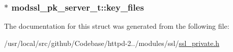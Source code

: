 \subsubsection[{\texorpdfstring{key\+\_\+files}{key_files}}]{$\ast$ modssl\+\_\+pk\+\_\+server\+\_\+t\+::key\+\_\+files}\hypertarget{structmodssl__pk__server__t_a268bb361b606aa0037602ee09eac319e}{}\label{structmodssl__pk__server__t_a268bb361b606aa0037602ee09eac319e}


The documentation for this struct was generated from the following file\+:\begin{DoxyCompactItemize}
\item 
/usr/local/src/github/\+Codebase/httpd-\/2../modules/ssl/\hyperlink{ssl__private_8h}{ssl\+\_\+private.\+h}\end{DoxyCompactItemize}
